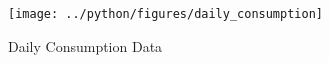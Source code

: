 \documentclass[11pt, a4paper, leqno]{article}
\begin{document}
\begin{figure}[H]

    \centering
    \texttt{[image: ../python/figures/daily\_consumption]}

    \caption{Daily Consumption Data}
    \label{fig:daily_consumption}

\end{figure}






\printbibliography
{}



\end{document}
